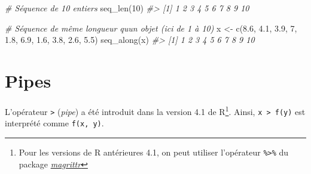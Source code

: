 \documentclass[
  french,
]{scrbook}
\newenvironment{Shaded}{\begin{snugshade}}{\end{snugshade}}
\newcommand{\CommentTok}[1]{\textcolor[rgb]{0.56,0.35,0.01}{\textit{#1}}}
\newcommand{\DecValTok}[1]{\textcolor[rgb]{0.00,0.00,0.81}{#1}}
\newcommand{\FloatTok}[1]{\textcolor[rgb]{0.00,0.00,0.81}{#1}}
\newcommand{\FunctionTok}[1]{\textcolor[rgb]{0.00,0.00,0.00}{#1}}
\newcommand{\NormalTok}[1]{#1}
\newcommand{\OtherTok}[1]{\textcolor[rgb]{0.56,0.35,0.01}{#1}}
\begin{document}
\begin{Shaded}
\begin{Highlighting}[]
\CommentTok{\# Séquence de 10 entiers}
\FunctionTok{seq\_len}\NormalTok{(}\DecValTok{10}\NormalTok{)}
\CommentTok{\#\textgreater{}  [1]  1  2  3  4  5  6  7  8  9 10}
\end{Highlighting}
\end{Shaded}

\begin{Shaded}
\begin{Highlighting}[]
\CommentTok{\# Séquence de même longueur qu\textquotesingle{}un objet (ici de 1 à 10)}
\NormalTok{x }\OtherTok{\textless{}{-}} \FunctionTok{c}\NormalTok{(}\FloatTok{8.6}\NormalTok{, }\FloatTok{4.1}\NormalTok{, }\FloatTok{3.9}\NormalTok{, }\DecValTok{7}\NormalTok{, }\FloatTok{1.8}\NormalTok{, }\FloatTok{6.9}\NormalTok{, }\FloatTok{1.6}\NormalTok{, }\FloatTok{3.8}\NormalTok{, }\FloatTok{2.6}\NormalTok{, }\FloatTok{5.5}\NormalTok{)}
\FunctionTok{seq\_along}\NormalTok{(x)}
\CommentTok{\#\textgreater{}  [1]  1  2  3  4  5  6  7  8  9 10}
\end{Highlighting}
\end{Shaded}

\hypertarget{fonctions-pipe}{%
\section{Pipes}\label{fonctions-pipe}}

L'opérateur \texttt{\textbar{}\textgreater{}} (\emph{pipe}) a été introduit dans la version 4.1 de R\footnote{Pour les versions de R antérieures 4.1, on peut utiliser l'opérateur \texttt{\%\textgreater{}\%} du package \href{https://magrittr.tidyverse.org/}{\emph{magrittr}}}. Ainsi, \texttt{x\ \textbar{}\textgreater{}\ f(y)} est interprété comme \texttt{f(x,\ y)}.
\end{document}
